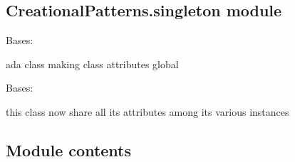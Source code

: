 \documentclass[letterpaper,10pt,english]{sphinxmanual}
\begin{document}
\subsection{CreationalPatterns.singleton module}
\label{\detokenize{CreationalPatterns:module-CreationalPatterns.singleton}}\label{\detokenize{CreationalPatterns:creationalpatterns-singleton-module}}

\begin{fulllineitems}
\label{\detokenize{CreationalPatterns:CreationalPatterns.singleton.Ada}}
\pysigstartsignatures
{}
\pysigstopsignatures
\sphinxAtStartPar
Bases: 

\sphinxAtStartPar
ada class making class attributes global

\end{fulllineitems}


\begin{fulllineitems}
\label{\detokenize{CreationalPatterns:CreationalPatterns.singleton.Axiata}}
\pysigstartsignatures
{}
\pysigstopsignatures
\sphinxAtStartPar
Bases: {\hyperref[\detokenize{CreationalPatterns:CreationalPatterns.singleton.Ada}]{}}

\sphinxAtStartPar
this class now share all its attributes among its various instances

\end{fulllineitems}



\subsection{Module contents}
\label{\detokenize{CreationalPatterns:module-CreationalPatterns}}\label{\detokenize{CreationalPatterns:module-contents}}
\sphinxstepscope
\end{document}
